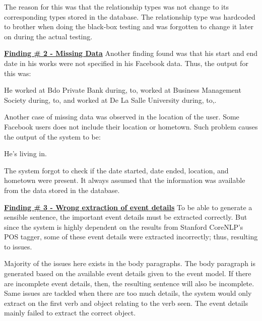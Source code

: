 The reason for this was that the relationship types was not change to its corresponding types stored in the database. The relationship type was hardcoded to brother when doing the black-box testing and was forgotten to change it later on during the actual testing. 

\underline{\textbf{Finding \# 2 - Missing Data}}
Another finding found was that his start and end date in his works were not specified in his Facebook data. Thus, the output for this was:

\begin{center}He worked at Bdo Private Bank during, to, worked at Business Management Society during, to, and worked at De La Salle University during, to,.\end{center}

Another case of missing data was observed in the location of the user. Some Facebook users does not include their location or hometown. Such problem causes the output of the system to be:

\begin{center}He's living in.\end{center}

The system forgot to check if the date started, date ended, location, and hometown were present. It always assumed that the information was available from the data stored in the database.


\underline{\textbf{Finding \# 3 - Wrong extraction of event details}}
To be able to generate a sensible sentence, the important event details must be extracted correctly. But since the system is highly dependent on the results from Stanford CoreNLP’s POS tagger, some of these event details were extracted incorrectly; thus, resulting to issues.

Majority of the issues here exists in the body paragraphs. The body paragraph is generated based on the available event details given to the event model. If there are incomplete event details, then, the resulting sentence will also be incomplete. Same issues are tackled when there are too much details, the system would only extract on the first verb and object relating to the verb seen. The event details mainly failed to extract the correct object. 


